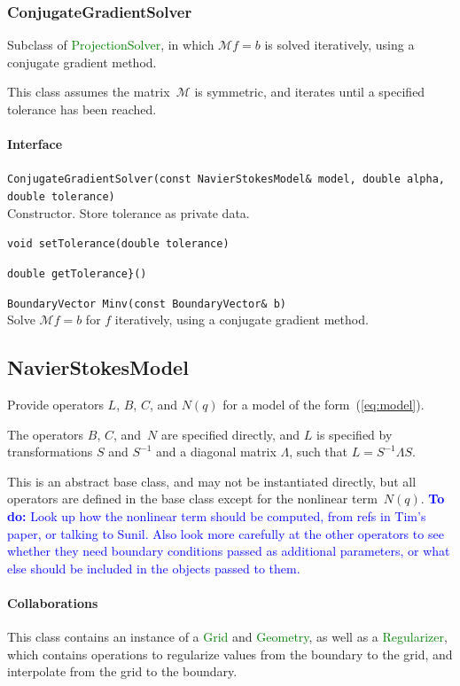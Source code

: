 \documentclass[11pt]{article}
\def\todo#1{\textcolor{blue}{{\bf To do:} #1}}
\def\class#1{\textcolor{green}{\ttfamily\small #1}} %
\let\code\lstinline
\begin{document}
\subsubsection{ConjugateGradientSolver}
Subclass of \class{ProjectionSolver}, in which $\mathcal{M}f=b$ is solved iteratively, using a conjugate gradient method.

This class assumes the matrix~$\mathcal{M}$ is symmetric, and iterates until a specified tolerance has been reached.

\paragraph{Interface}
\begin{description}
	\item \code|ConjugateGradientSolver(const NavierStokesModel& model, double alpha, double tolerance)|\\
		Constructor.  Store tolerance as private data.
	\item \code|void setTolerance(double tolerance)|
	\item \code|double getTolerance}()|
	\item \code|BoundaryVector Minv(const BoundaryVector& b)|\\
		Solve $\mathcal{M}f = b$ for $f$ iteratively, using a conjugate gradient method.
\end{description}


\subsection{NavierStokesModel}
Provide operators $L$, $B$, $C$, and $N(q)$ for a model of the form~(\ref{eq:model}).

The operators $B$, $C$, and~$N$ are specified directly, and $L$ is specified by transformations $S$ and $S^{-1}$ and a diagonal matrix $\Lambda$, such that $L=S^{-1}\Lambda S$.

This is an abstract base class, and may not be instantiated directly, but all operators are defined in the base class except for the nonlinear term~$N(q)$.  \todo{Look up how the nonlinear term should be computed, from refs in Tim's paper, or talking to Sunil.  Also look more carefully at the other operators to see whether they need boundary conditions passed as additional parameters, or what else should be included in the objects passed to them.}

\paragraph{Collaborations}
This class contains an instance of a \class{Grid} and \class{Geometry}, as well as a \class{Regularizer}, which contains operations to regularize values from the boundary to the grid, and interpolate from the grid to the boundary.
\end{document}
